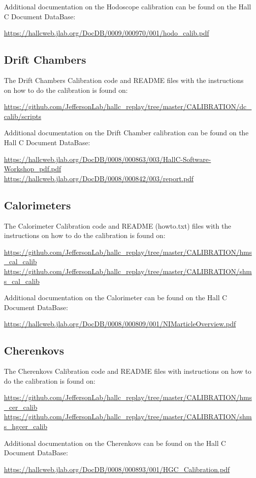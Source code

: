 \documentclass[14pt]{article}
\begin{document}
Additional documentation on the Hodoscope calibration can be found on the Hall C Document DataBase:
\begin{center}
  \url{https://hallcweb.jlab.org/DocDB/0009/000970/001/hodo_calib.pdf}
\end{center}

\subsection{Drift Chambers}
The Drift Chambers Calibration code and README files with the instructions on how to do the calibration is found on:
\begin{center}
\url{https://github.com/JeffersonLab/hallc_replay/tree/master/CALIBRATION/dc_calib/scripts}  
\end{center}

Additional documentation on the Drift Chamber calibration can be found on the Hall C Document DataBase:
\begin{center}
  \url{https://hallcweb.jlab.org/DocDB/0008/000863/003/HallC-Software-Workshop_pdf.pdf}\\
  \url{https://hallcweb.jlab.org/DocDB/0008/000842/003/report.pdf}
\end{center}
\subsection{Calorimeters}
The Calorimeter Calibration code and README (howto.txt) files with the instructions on how to do the calibration is found on:
\begin{center}
  \url{https://github.com/JeffersonLab/hallc_replay/tree/master/CALIBRATION/hms_cal_calib} \\
  \url{https://github.com/JeffersonLab/hallc_replay/tree/master/CALIBRATION/shms_cal_calib}
\end{center}

Additional documentation on the Calorimeter can be found on the Hall C Document DataBase:
\begin{center}
\url{https://hallcweb.jlab.org/DocDB/0008/000809/001/NIMarticleOverview.pdf}
\end{center}
\subsection{Cherenkovs}
The Cherenkovs Calibration code and README files with instructions on how to do the calibration is found on:
\begin{center}
  \url{https://github.com/JeffersonLab/hallc_replay/tree/master/CALIBRATION/hms_cer_calib} \\
  \url{https://github.com/JeffersonLab/hallc_replay/tree/master/CALIBRATION/shms_hgcer_calib}
\end{center}
Additional documentation on the Cherenkovs can be found on the Hall C Document DataBase:
\begin{center}
\url{https://hallcweb.jlab.org/DocDB/0008/000893/001/HGC_Calibration.pdf}
\end{center}
\end{document}
